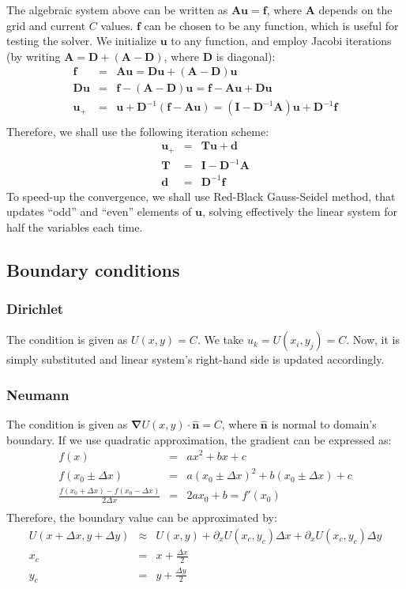 \documentclass[11pt]{article}
\newcommand{\vect}[1]{\ensuremath{\mathbf{#1}}}
\newcommand{\matr}[1]{\ensuremath{\mathbf{#1}}}
\providecommand\bnabla{\boldsymbol{\nabla}}
\begin{document}
The algebraic system above can be written as $\matr{A} \vect{u} = \vect{f}$,
where $\matr{A}$ depends on the grid and current $C$ values.
$\vect{f}$ can be chosen to be any function, which is useful for testing the solver.
We initialize $\vect{u}$ to any function, and employ Jacobi iterations
(by writing $\matr{A} = \matr{D} + (\matr{A-D})$, where $\matr{D}$ is diagonal):
\begin{eqnarray}
\vect{f} &=& \matr{A}\vect{u} = \matr{D}\vect{u} + (\matr{A-D})\vect{u} \\
\matr{D}\vect{u} &=& \vect{f} - (\matr{A-D})\vect{u} =
\vect{f} - \matr{A}\vect{u} + \matr{D}\vect{u} \\
\vect{u}_+ &=& \vect{u} + \matr{D}^{-1}(\vect{f} - \matr{A}\vect{u}) =
(\matr{I} - \matr{D}^{-1}\matr{A}) \vect{u} + \matr{D}^{-1}\vect{f} \\
\end{eqnarray}
Therefore, we shall use the following iteration scheme:
\begin{eqnarray}
\vect{u}_+ &=& \matr{T}\vect{u} + \vect{d} \\
\matr{T} &=& \matr{I} - \matr{D}^{-1}\matr{A} \\
\vect{d} &=& \matr{D}^{-1}\vect{f}
\end{eqnarray}
To speed-up the convergence, we shall use Red-Black Gauss-Seidel method,
that updates ``odd'' and ``even'' elements of $\vect{u}$, solving
effectively the linear system for half the variables each time.
\subsection{Boundary conditions}
\subsubsection{Dirichlet}
The condition is given as $U(x, y) = C$.
We take $u_k = U(x_i, y_j) = C$.
Now, it is simply substituted and
linear system's right-hand side is updated accordingly.

\subsubsection{Neumann}
The condition is given as $\bnabla U(x,y) \cdot \vect{\hat n} = C$,
where $\vect{\hat n}$ is normal to domain's boundary.
If we use quadratic approximation, the gradient can be expressed as:
\begin{eqnarray}
  f(x) &=& ax^2 + bx + c \\
  f(x_0 \pm \Delta x) &=&
   a(x_0 \pm \Delta x)^2 + b(x_0 \pm \Delta x) + c \\
  \frac{f(x_0 + \Delta x) - f(x_0 - \Delta x)}{2\Delta x} &=&
   2a x_0 + b = f'(x_0) \\
\end{eqnarray}
Therefore, the boundary value can be approximated by:
\begin{eqnarray}
 U(x + \Delta x,y + \Delta y) &\approx& U(x, y) + \partial_x U(x_c,y_c) \Delta x +
 \partial_x U(x_c,y_c) \Delta y \\
 x_c &=& x + \frac{\Delta x}{2} \\
 y_c &=& y + \frac{\Delta y}{2}
\end{eqnarray}
\end{document}
